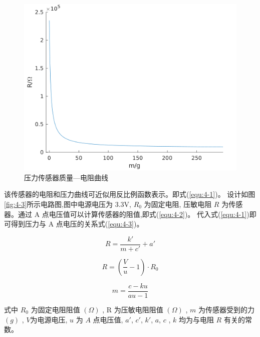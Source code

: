\begin{figure}[!ht]
  \centering
  \includegraphics[scale=0.7]{chapter04/pic/4-2}
  \caption{压力传感器质量---电阻曲线}
  \label{fig:4-2}
  \vspace{-0.3cm}
\end{figure}

该传感器的电阻和压力曲线可近似用反比例函数表示。即式(\ref{equ:4-1})。
设计如图\ref{fig:4-3}所示电路图,图中电源电压为 3.3V, $R_0$ 为固定电阻,
压敏电阻 $R$ 为传感器。通过 A 点电压值可以计算传感器的阻值,即式(\ref{equ:4-2})。
代入式(\ref{equ:4-1})即可得到压力与 A 点电压的关系式(\ref{equ:4-3})。

\vspace{-10pt}
\begin{equation}
  \label{equ:4-1}
  R = \frac{{k'}}{{m + c'}} + a'
\end{equation}
\vspace{-30pt}

\begin{equation}
  \label{equ:4-2}
  R = (\frac{V}{u} - 1) \cdot {R_0}
\end{equation}
\vspace{-30pt}

\begin{equation}
  \label{equ:4-3}
  m = \frac{{c - ku}}{{au - 1}}
\end{equation}

式中 $R_0$ 为固定电阻阻值 $(\Omega )$ , R 为压敏电阻阻值 $(\Omega )$ ,
$m$ 为传感器受到的力 $(g)$ , $V$为电源电压, $u$ 为 $A$ 点电压值,
$a'$, $c'$, $k'$, $a$, $c$ , $k$ 均为与电阻 $R$ 有关的常数。

